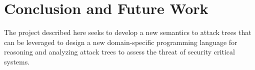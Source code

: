 

\section{Conclusion and Future Work}
\label{sec:conclusion}

The project described here seeks to develop a new semantics to attack
trees that can be leveraged to design a new domain-specific
programming language for reasoning and analyzing attack trees to assess
the threat of security critical systems.

